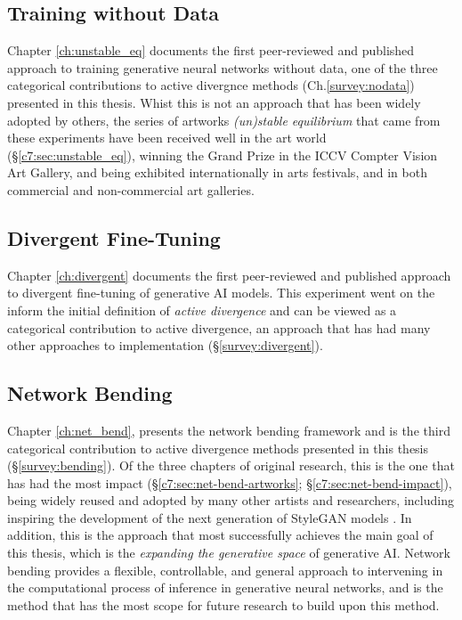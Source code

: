 \subsection{Training without Data}

Chapter \ref{ch:unstable_eq} documents the first peer-reviewed and published approach to training generative neural networks without data, one of the three categorical contributions to active divergnce methods (Ch.\ref{survey:nodata}) presented in this thesis.
Whist this is not an approach that has been widely adopted by others, the series of artworks \textit{(un)stable equilibrium} that came from these experiments have been received well in the art world (\S \ref{c7:sec:unstable_eq}), winning the Grand Prize in the ICCV Compter Vision Art Gallery, and being exhibited internationally in arts festivals, and in both commercial and non-commercial art galleries. 

\subsection{Divergent Fine-Tuning}

Chapter \ref{ch:divergent} documents the first peer-reviewed and published approach to divergent fine-tuning of generative AI models.
This experiment went on the inform the initial definition of \textit{active divergence} \citep{berns2020bridging} and can be viewed as a categorical contribution to active divergence, an approach that has had many other approaches to implementation (\S \ref{survey:divergent}).


\subsection{Network Bending}

Chapter \ref{ch:net_bend}, presents the network bending framework and is the third categorical contribution to active divergence methods presented in this thesis (\S \ref{survey:bending}).
Of the three chapters of original research, this is the one that has had the most impact  (\S \ref{c7:sec:net-bend-artworks}; \S \ref{c7:sec:net-bend-impact}), being widely reused and adopted by many other artists and researchers, including inspiring the development of the next generation of StyleGAN models \citep{karras2021alias}.
In addition, this is the approach that most successfully achieves the main goal of this thesis, which is the \textit{expanding the generative space} of generative AI. 
Network bending provides a flexible, controllable, and general approach to intervening in the computational process of inference in generative neural networks, and is the method that has the most scope for future research to build upon this method.

